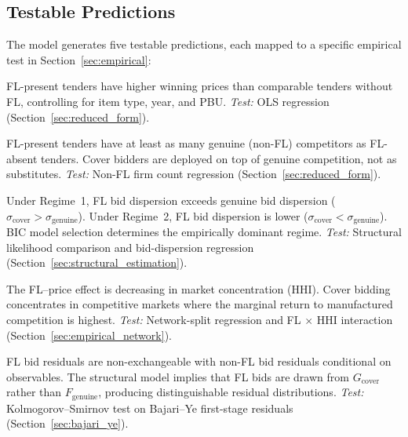 \subsection{Testable Predictions}
\label{sec:predictions}

The model generates five testable predictions, each mapped to a specific
empirical test in Section~\ref{sec:empirical}:

\begin{prediction}
\label{pred:price_v6}
FL-present tenders have higher winning prices than comparable tenders
without FL, controlling for item type, year, and PBU.
\emph{Test:} OLS regression (Section~\ref{sec:reduced_form}).
\end{prediction}

\begin{prediction}
\label{pred:selection_v6}
FL-present tenders have at least as many genuine (non-FL) competitors as
FL-absent tenders. Cover bidders are deployed on top of genuine
competition, not as substitutes.
\emph{Test:} Non-FL firm count regression (Section~\ref{sec:reduced_form}).
\end{prediction}

\begin{prediction}
\label{pred:regime_v6}
Under Regime~1, FL bid dispersion exceeds genuine bid dispersion
($\sigma_{\text{cover}} > \sigma_{\text{genuine}}$). Under Regime~2,
FL bid dispersion is lower ($\sigma_{\text{cover}} <
\sigma_{\text{genuine}}$). BIC model selection determines the
empirically dominant regime.
\emph{Test:} Structural likelihood comparison and bid-dispersion
regression (Section~\ref{sec:structural_estimation}).
\end{prediction}

\begin{prediction}
\label{pred:market_v6}
The FL--price effect is decreasing in market concentration (HHI).
Cover bidding concentrates in competitive markets where the marginal
return to manufactured competition is highest.
\emph{Test:} Network-split regression and FL $\times$ HHI interaction
(Section~\ref{sec:empirical_network}).
\end{prediction}

\begin{prediction}
\label{pred:exchange_v6}
FL bid residuals are non-exchangeable with non-FL bid residuals
conditional on observables. The structural model implies that FL bids
are drawn from $G_{\text{cover}}$ rather than $F_{\text{genuine}}$,
producing distinguishable residual distributions.
\emph{Test:} Kolmogorov--Smirnov test on Bajari--Ye first-stage
residuals (Section~\ref{sec:bajari_ye}).
\end{prediction}
